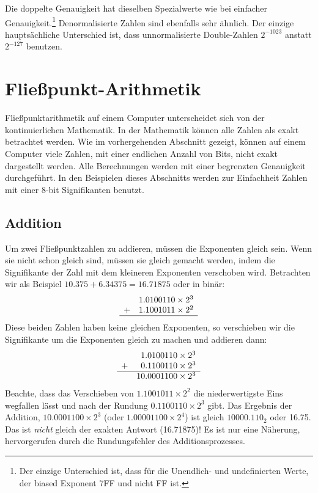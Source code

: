 Die doppelte Genauigkeit hat dieselben Spezialwerte wie bei
einfacher Genauigkeit.\footnote{Der einzige Unterschied ist, dass
f\"{u}r die Unendlich- und undefinierten Werte, der biased Exponent 7FF
und nicht FF ist.} Denormalisierte Zahlen sind ebenfalls sehr
\"{a}hnlich. Der einzige haupt\-s\"{a}ch\-li\-che Unterschied ist, dass
unnormalisierte Double-Zahlen $2^{-1023}$ anstatt $2^{-127}$
benutzen. 

\section{Flie{\ss}punkt-Arithmetik} 

Flie{\ss}punktarithmetik auf einem Computer unterscheidet sich von der
kontinuierlichen Mathematik. In der Mathematik k\"{o}nnen alle Zahlen
als exakt betrachtet werden. Wie im vorhergehenden Abschnitt
gezeigt, k\"{o}nnen auf einem Computer viele Zahlen, mit einer endlichen
Anzahl von Bits, nicht exakt dargestellt werden. Alle Berechnungen
werden mit einer begrenzten Genauigkeit durchgef\"{u}hrt. In den
Beispielen dieses Abschnitts werden zur Einfachheit Zahlen mit einer
8-bit Signifikanten benutzt.

\subsection{Addition}
Um zwei Flie{\ss}punktzahlen zu addieren, m\"{u}ssen die Exponenten gleich
sein. Wenn sie nicht schon gleich sind, m\"{u}ssen sie gleich gemacht
werden, indem die Signifikante der Zahl mit dem kleineren Exponenten
verschoben wird. Betrachten wir als Beispiel $10.375 + 6.34375 =
16.71875$ oder in bin\"{a}r:
\[
\begin{array}{rr}
  & 1.0100110 \times 2^3 \\
 +& 1.1001011 \times 2^2 \\ \hline
\end{array}
\]
Diese beiden Zahlen haben keine gleichen Exponenten, so verschieben
wir die Signifikante um die Exponenten gleich zu machen und addieren
dann:
\[
\begin{array}{rr@{.}l}
  &  1&0100110 \times 2^3 \\
 +&  0&1100110 \times 2^3 \\ \hline
  & 10&0001100 \times 2^3
\end{array}
\]
Beachte, dass das Verschieben von $1.1001011 \times 2^2$ die
niederwertigste Eins wegfallen l\"{a}sst und nach der Rundung $0.1100110
\times 2^3$ gibt. Das Ergebnis der Addition, $10.0001100 \times 2^3$
(oder $1.00001100 \times 2^4$) ist gleich $10000.110_2$ oder 16.75.
Das ist \emph{nicht} gleich der exakten Antwort (16.71875)! Es ist
nur eine N\"{a}herung, hervorgerufen durch die Rundungsfehler des
Additionsprozesses.

